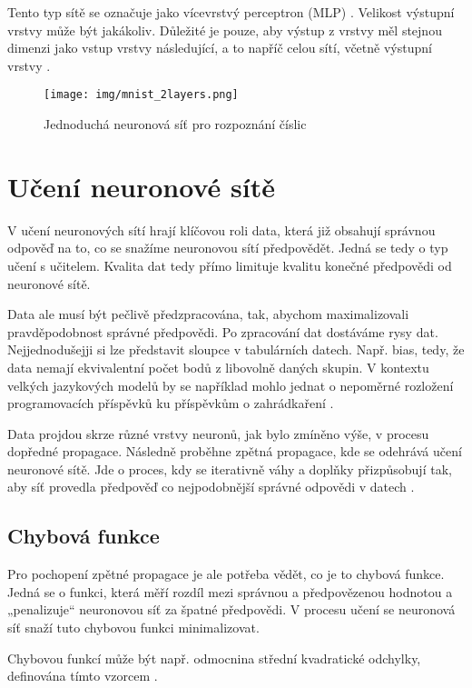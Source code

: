 \documentclass[FM,DP]{tulthesis}
\begin{document}
		Tento typ sítě se označuje jako vícevrstvý perceptron (MLP) \cite{mnist}. Velikost výstupní vrstvy může být jakákoliv. Důležité je pouze, aby výstup z vrstvy měl stejnou dimenzi jako vstup vrstvy následující, a to napříč celou sítí, včetně výstupní vrstvy \cite{mnist}.
		
		\begin{figure}[H]
			\centering
			\texttt{[image: img/mnist\_2layers.png]}
			\caption{Jednoduchá neuronová síť pro rozpoznání číslic \cite{mnist}}
			\label{fig:mnist}
		\end{figure}
		
		\section{Učení neuronové sítě} \label{training}
		V učení neuronových sítí hrají klíčovou roli data, která již obsahují správnou odpověď na to, co se snažíme neuronovou sítí předpovědět. Jedná se tedy o typ učení s učitelem. Kvalita dat tedy přímo limituje kvalitu konečné předpovědi od neuronové sítě. 
		
		Data ale musí být pečlivě předzpracována, tak, abychom maximalizovali pravděpodobnost správné předpovědi. Po zpracování dat dostáváme rysy dat. Nejjednodušejji si lze představit sloupce v tabulárních datech. Např. bias, tedy, že data nemají ekvivalentní počet bodů z libovolně daných skupin. V kontextu velkých jazykových modelů by se například mohlo jednat o nepoměrné rozložení programovacích příspěvků ku příspěvkům o zahrádkaření \cite{rubiks_code}.
		
		Data projdou skrze různé vrstvy neuronů, jak bylo zmíněno výše, v procesu dopředné propagace. Následně proběhne zpětná propagace, kde se odehrává učení neuronové sítě. Jde o proces, kdy se iterativně váhy a doplňky přizpůsobují tak, aby síť provedla předpověď co nejpodobnější správné odpovědi v datech \cite{rubiks_code}.
		
		\subsection{Chybová funkce}
		Pro pochopení zpětné propagace je ale potřeba vědět, co je to chybová funkce. Jedná se o funkci, která měří rozdíl mezi správnou a předpovězenou hodnotou a „penalizuje“ neuronovou síť za špatné předpovědi. V procesu učení se neuronová síť snaží tuto chybovou funkci minimalizovat. 
		
		Chybovou funkcí může být např. odmocnina střední kvadratické odchylky, definována tímto vzorcem \cite{RMSE}.
		
\end{document}
